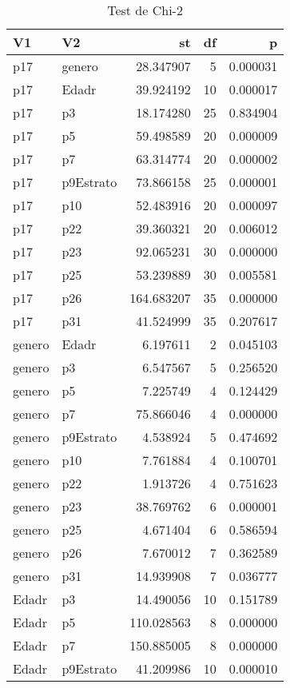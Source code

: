 \begin{table}

\caption{Test de Chi-2}
\centering
\begin{tabular}[t]{l|l|r|r|r}
\hline
V1 & V2 & st & df & p\\
\hline
p17 & genero & 28.347907 & 5 & 0.000031\\
\hline
p17 & Edadr & 39.924192 & 10 & 0.000017\\
\hline
p17 & p3 & 18.174280 & 25 & 0.834904\\
\hline
p17 & p5 & 59.498589 & 20 & 0.000009\\
\hline
p17 & p7 & 63.314774 & 20 & 0.000002\\
\hline
p17 & p9Estrato & 73.866158 & 25 & 0.000001\\
\hline
p17 & p10 & 52.483916 & 20 & 0.000097\\
\hline
p17 & p22 & 39.360321 & 20 & 0.006012\\
\hline
p17 & p23 & 92.065231 & 30 & 0.000000\\
\hline
p17 & p25 & 53.239889 & 30 & 0.005581\\
\hline
p17 & p26 & 164.683207 & 35 & 0.000000\\
\hline
p17 & p31 & 41.524999 & 35 & 0.207617\\
\hline
genero & Edadr & 6.197611 & 2 & 0.045103\\
\hline
genero & p3 & 6.547567 & 5 & 0.256520\\
\hline
genero & p5 & 7.225749 & 4 & 0.124429\\
\hline
genero & p7 & 75.866046 & 4 & 0.000000\\
\hline
genero & p9Estrato & 4.538924 & 5 & 0.474692\\
\hline
genero & p10 & 7.761884 & 4 & 0.100701\\
\hline
genero & p22 & 1.913726 & 4 & 0.751623\\
\hline
genero & p23 & 38.769762 & 6 & 0.000001\\
\hline
genero & p25 & 4.671404 & 6 & 0.586594\\
\hline
genero & p26 & 7.670012 & 7 & 0.362589\\
\hline
genero & p31 & 14.939908 & 7 & 0.036777\\
\hline
Edadr & p3 & 14.490056 & 10 & 0.151789\\
\hline
Edadr & p5 & 110.028563 & 8 & 0.000000\\
\hline
Edadr & p7 & 150.885005 & 8 & 0.000000\\
\hline
Edadr & p9Estrato & 41.209986 & 10 & 0.000010\\

\end{tabular}
\end{table}
